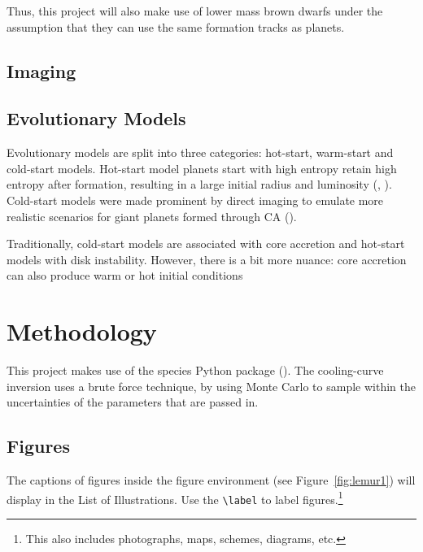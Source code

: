 \documentclass[11pt]{report}
\begin{document}
\begin{mainf}
Thus, this project will also make use of lower mass brown dwarfs under the assumption that they can use the same formation tracks as planets.

\section{Imaging}


\section{Evolutionary Models}
Evolutionary models are split into three categories: hot-start, warm-start and cold-start models. 
Hot-start model planets start with high entropy retain high entropy after formation, resulting in a
large initial radius and luminosity (\citealp{Bowler2016a}, \citealp{Bussmann2026}). 
Cold-start models were made prominent by direct imaging to emulate more realistic scenarios for giant planets formed through CA (\citealp{Bowler2016a}).

Traditionally, cold-start models are associated with core accretion
and hot-start models with disk instability. However, there is a bit more nuance: core accretion can also produce warm or hot initial conditions

\chapter{Methodology}
This project makes use of the species Python package (\citealp{Stolker2020}). The cooling-curve inversion uses a brute force technique, by using Monte Carlo to
sample within the uncertainties of the parameters that are passed in.


\section{Figures}
The captions of figures inside the figure environment (see Figure~\ref{fig:lemur1}) will display in the List of Illustrations. Use the \Verb|\label| to label figures.\footnote{This also includes photographs, maps, schemes, diagrams, etc.}
\newpage

\end{mainf}
\end{document}
